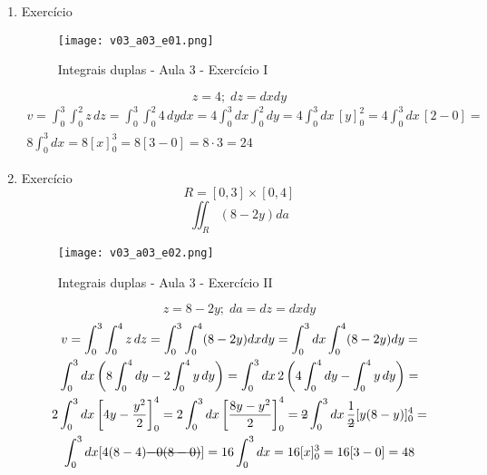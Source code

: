 \begin{enumerate}
	\item Exercício
	
	\begin{figure}[htb]
		\caption{Integrais duplas - Aula 3 - Exercício I}
		\label{v03_a03_e01}
		\centering
		\texttt{[image: v03\_a03\_e01.png]}		
	\end{figure}
	
	\begin{equation*}
		z = 4;\; dz = dx dy	
	\end{equation*}	
	\begin{gather*}
		v = \int_0^3 \int_0^2 z\, dz = \int_0^3 \int_0^2 4\, dy dx = 4\int_0^3 dx \int_0^2 dy = 4\int_0^3 dx\, [y]_0^2 = 4\int_0^3 dx\, [2 - 0] =\\ 8\int_0^3 dx = 8[x]_0^3 = 8[3 - 0] = 8 \cdot 3 = 24
	\end{gather*}
		
	\item Exercício
	\begin{equation*}
		R = [0, 3] \times [0,4]
	\end{equation*}
	\begin{equation*}
		\iint_R (8 - 2y) da
	\end{equation*}
	
	\begin{figure}[htb]
		\caption{Integrais duplas - Aula 3 - Exercício II}
		\label{v03_a03_e02}
		\centering
		\texttt{[image: v03\_a03\_e02.png]}		
	\end{figure}	
	
	\begin{equation*}
		z = 8 - 2y;\; da = dz = dx dy
	\end{equation*}
	\begin{gather*}
		v = \int_0^3 \int_0^4 z\,dz = \int_0^3 \int_0^4(8 - 2y)dx dy = \int_0^3 dx \int_0^4(8 - 2y) dy =\\ \int_0^3 dx \left(8\int_0^4 dy - 2\int_0^4 y\,dy\right) = \int_0^3 dx\, 2\left(4\int_0^4 dy - \int_0^4 y\,dy\right) =\\ 2\int_0^3 dx \left[4y - \dfrac{y^2}{2}\right]_0^4 = 2\int_0^3 dx \left[\dfrac{8y - y^2}{2}\right]_0^4 = \overstrike{2}\int_0^3 dx\, \dfrac{1}{\overstrike{2}}[y(8 - y)]_0^4 =\\ \int_0^3 dx[4(8 - 4) \overstrike{- 0(8 - 0)}] = 16\int_0^3 dx = 16[x]_0^3 = 16[3 - 0] = 48
	\end{gather*}
\end{enumerate}